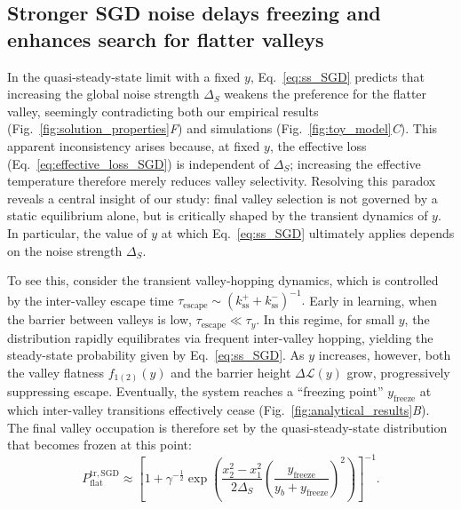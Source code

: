 \documentclass[aps,prx,reprint,superscriptaddress,longbibliography,nofootinbib,floatfix]{revtex4-2}
\begin{document}
\subsection{Stronger SGD noise delays freezing and enhances search for flatter valleys}
In the quasi-steady-state limit with a fixed $y$, Eq.~\ref{eq:ss_SGD} predicts that increasing the global noise strength $\Delta_S$ weakens the preference for the flatter valley, seemingly contradicting both our empirical results (Fig.~\ref{fig:solution_properties}\textit{F}) and simulations (Fig.~\ref{fig:toy_model}\textit{C}). This apparent inconsistency arises because, at fixed $y$, the effective loss (Eq.~\ref{eq:effective_loss_SGD}) is independent of $\Delta_S$; increasing the effective temperature therefore merely reduces valley selectivity. Resolving this paradox reveals a central insight of our study: final valley selection is not governed by a static equilibrium alone, but is critically shaped by the transient dynamics of $y$. In particular, the value of $y$ at which Eq.~\ref{eq:ss_SGD} ultimately applies depends on the noise strength $\Delta_S$.

To see this, consider the transient valley-hopping dynamics, which is controlled by the inter-valley escape time $
\tau_{\mathrm{escape}} \sim (k_{\mathrm{ss}}^{+}+k_{\mathrm{ss}}^{-})^{-1}.
$
Early in learning, when the barrier between valleys is low, \(\tau_{\mathrm{escape}} \ll \tau_y\). In this regime, for small \(y\), the distribution rapidly equilibrates via frequent inter-valley hopping, yielding the steady-state probability given by Eq.~\ref{eq:ss_SGD}. As \(y\) increases, however, both the valley flatness \(f_{1(2)}(y)\) and the barrier height \(\Delta\mathcal{L}(y)\) grow, progressively suppressing escape. Eventually, the system reaches a ``freezing point'' \(y_{\mathrm{freeze}}\) at which inter-valley transitions effectively cease (Fig.~\ref{fig:analytical_results}\textit{B}). The final valley occupation is therefore set by the quasi-steady-state distribution that becomes frozen at this point:
\begin{equation}
P_{\mathrm{flat}}^{\mathrm{tr,SGD}} \approx 
\left[1+\gamma^{-\frac{1}{2}} 
\exp\!\left(\frac{x_2^2-x_1^2}{2 \Delta_S}
\left(\frac{y_\mathrm{freeze}}{y_b+y_\mathrm{freeze}}\right)^2\right)\right]^{-1}.
\label{eq:tr_SGD_original}
\end{equation}
\end{document}
